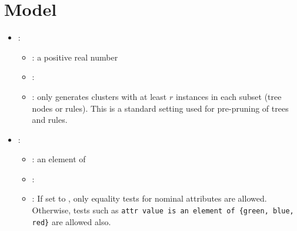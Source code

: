 \section{Model}


\begin{itemize}
    \item {}:
           \begin{itemize}
                \item \optionPossibleValues{}: a positive real number
                \item \optionDefaultValue{}: 
                \item \optionDescrption{}: \clus{} only generates clusters with at least $r$ instances in each subset (tree nodes or rules). This is a standard setting used for pre-pruning of trees and rules.
           \end{itemize}
    \item {}:
           \begin{itemize}
                \item \optionPossibleValues{}: an element of 
                \item \optionDefaultValue{}: 
                \item \optionDescrption{}: If set to , only equality tests for nominal attributes are allowed. Otherwise, tests such as \texttt{attr value is an element of \{green, blue, red\}} are allowed also.
           \end{itemize}
\end{itemize}
